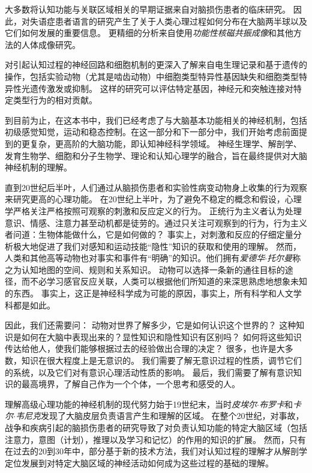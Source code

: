 大多数将认知功能与关联区域相关的早期证据来自对脑损伤患者的临床研究。
因此，对失语症患者语言的研究产生了关于人类心理过程如何分布在大脑两半球以及它们如何发展的重要信息。
更精细的分析来自使用\textit{功能性核磁共振成像}和其他方法的人体成像研究。


对引起认知过程的神经回路和细胞机制的更深入了解来自电生理记录和基于遗传的操作，包括实验动物（尤其是啮齿动物）中细胞类型特异性基因缺失和细胞类型特异性光遗传激发或抑制。
这样的研究可以评估特定基因，神经元和突触连接对特定类型行为的相对贡献。


到目前为止，在这本书中，我们已经考虑了与大脑基本功能相关的神经机制，包括初级感觉知觉，运动和稳态控制。在这一部分和下一部分中，我们开始考虑前面提到的更复杂，更高阶的大脑功能，即认知神经科学领域。
神经生理学、解剖学、发育生物学、细胞和分子生物学、理论和认知心理学的融合，旨在最终提供对大脑神经机制的理解。


直到20世纪后半叶，人们通过从脑损伤患者和实验性病变动物身上收集的行为观察来研究更高的心理功能。
在20世纪上半叶，为了避免不稳定的概念和假设，心理学严格关注严格按照可观察的刺激和反应定义的行为。
正统行为主义者认为处理意识、情感、注意力甚至动机都是徒劳的。通过只关注可观察到的行为，行为主义者问道：生物体能做什么，它是如何做的？
事实上，对刺激和反应的仔细定量分析极大地促进了我们对感知和运动技能“隐性”知识的获取和使用的理解。
然而，人类和其他高等动物也对事实和事件有“明确”的知识。他们拥有\textit{爱德华$\cdot$托尔曼}称之为认知地图的空间、规则和关系知识。
动物可以选择一条新的通往目标的途径，而不必学习感官反应关联，人类可以根据他们所知道的来深思熟虑地想象未知的东西。
事实上，这正是神经科学成为可能的原因，事实上，所有科学和人文学科都是如此。


因此，我们还需要问：
动物对世界了解多少，它是如何认识这个世界的？
这种知识是如何在大脑中表现出来的？显性知识和隐性知识有区别吗？
如何将这些知识传达给他人，使我们能够根据过去的经验做出合理的决定？
很多，也许是大多数，知识在很大程度上是无意识的。
我们需要了解无意识过程的性质，调节它们的系统，以及它们对有意识心理活动性质的影响。
最后，我们需要了解有意识知识的最高境界，了解自己作为一个个体，一个思考和感受的人。


理解高级心理功能的神经机制的现代努力始于19世纪末，当时\textit{皮埃尔$\cdot$布罗卡}和\textit{卡尔$\cdot$韦尼克}发现了大脑皮层负责语言产生和理解的区域。
在整个20世纪，对事故，战争和疾病引起的脑损伤患者的研究导致了对负责认知功能的特定大脑区域（包括注意力，意图（计划），推理以及学习和记忆）的作用的知识的扩展。
然而，只有在过去的20到30年中，部分基于新的技术方法，我们对认知过程的理解才从解剖学定位发展到对特定大脑区域的神经活动如何成为这些过程的基础的理解。


